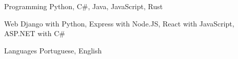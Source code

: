 


\begin{cvskills}


  \cvskill
  {Programming} %
  {Python, C\#, Java, JavaScript, Rust} %


  \cvskill
  {Web} %
  {Django with Python, Express with Node.JS, React with JavaScript, ASP.NET with C\#} %


  \cvskill
  {Languages} %
  {Portuguese, English} %


\end{cvskills}